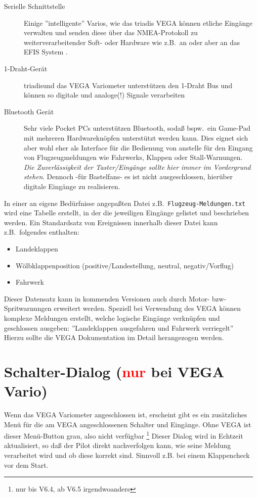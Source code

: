 \begin{description}
     \item[Serielle Schnittstelle]  Einige ''intelligente'' Varios, wie das \textsf{triadis} VEGA  können etliche Eingänge verwalten und senden diese über das NMEA-Protokoll zu weiterverarbeitender Soft- oder Hardware wie z.B.\ an \xc oder aber an das EFIS System \al.
     \item[1-Draht-Gerät]  \textsf{triadis}\al und das VEGA Variometer unterstützen den 1-Draht Bus und können so digitale und analoge(!) Signale verarbeiten
     \item[Bluetooth Gerät]  Sehr viele Pocket \textsf{PC}s unterstützen Bluetooth, sodaß bspw.\ ein Game-Pad mit mehreren  Hardwareknöpfen unterstützt werden kann.
     Dies eignet sich aber wohl eher als Interface für die Bedienung von \xc anstelle für den Eingang von Flugzeugmeldungen wie Fahrwerks, Klappen oder Stall-Warnungen.
     \textsl{Die Zuverlässigkeit der Taster/Eingänge sollte hier immer im Vordergrund stehen}.
        Dennoch -für Bastelfans- es ist nicht ausgeschlossen, hierüber digitale Eingänge zu realisieren.
\end{description}

In einer an eigene Bedürfnisse angepaßten Datei z.B.\ \texttt{Flugzeug-Meldungen.txt} wird eine Tabelle erstellt, in der die jeweiligen Eingänge gelistet und beschrieben werden. Ein Standardsatz von Ereignissen innerhalb dieser Datei  kann z.B.\ folgendes enthalten:
\begin{itemize}
  \item Landeklappen
  \item Wölbklappenposition (positive/Landestellung, neutral, negativ/Vorflug)
  \item Fahrwerk
\end{itemize}

\halt Dieser Datensatz kann in kommenden Versionen auch durch Motor- bzw- Spritwarnungen erweitert werden.
Speziell bei Verwendung des VEGA können komplexe Meldungen erstellt, welche logische Eingänge verknüpfen und geschlossen ausgeben: ''Landeklappen ausgefahren und Fahrwerk verriegelt''  Hierzu sollte die VEGA Dokumentation im Detail herangezogen werden.
\section{Schalter-Dialog (\textcolor{red}{nur} bei VEGA Vario)}

Wenn das VEGA Variometer angeschlossen ist, erscheint gibt es ein zusätzliches Menü für die am VEGA angeschlossenen Schalter und Eingänge. Ohne VEGA ist dieser Menü-Button grau, also nicht verfügbar \footnote{nur bis V6.4, ab V6.5 irgendwoanders}%
Dieser Dialog wird in Echtzeit aktualisiert, so daß der Pilot direkt nachverfolgen kann, wie seine Meldung verarbeitet wird und ob diese korrekt sind.
Sinnvoll z.B. bei einem Klappencheck vor dem Start.


